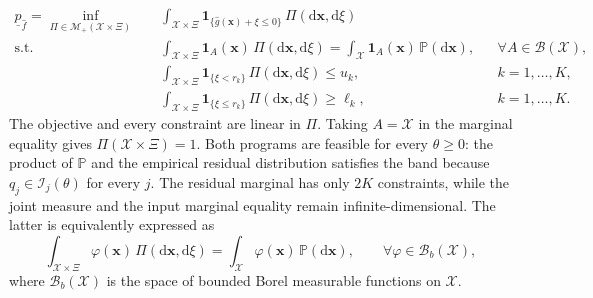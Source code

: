 \begin{equation}
  \begin{aligned}
    \underline p_{\hat f}
    =\inf_{\Pi\in\mathcal M_+(\mathcal X\times\Xi)}\quad&
    \int_{\mathcal X\times\Xi}
    \mathbf1_{\{\hat g(\bm x)+\xi\le0\}}\,\Pi\left(\mathrm d\bm x,\mathrm d\xi\right)\\
    \text{s.t.}\quad&
    \int_{\mathcal X\times\Xi}\mathbf1_A(\bm x)\,\Pi\left(\mathrm d\bm x,\mathrm d\xi\right)
    =\int_{\mathcal X}\mathbf1_A(\bm x)\,\mathbb P\left(\mathrm d\bm x\right),
    &&\forall A\in\mathcal B(\mathcal X),\\
    &\int_{\mathcal X\times\Xi}
    \mathbf1_{\{\xi<r_k\}}\,\Pi\left(\mathrm d\bm x,\mathrm d\xi\right)\le u_k,
    &&k=1,\ldots,K,\\
    &\int_{\mathcal X\times\Xi}
    \mathbf1_{\{\xi\le r_k\}}\,\Pi\left(\mathrm d\bm x,\mathrm d\xi\right)\ge\ell_k,
    &&k=1,\ldots,K.
  \end{aligned}
  \label{eq-measure-lower}
\end{equation}
The objective and every constraint are linear in $\Pi$. Taking $A=\mathcal X$ in the marginal equality gives $\Pi(\mathcal X\times\Xi)=1$. Both programs are feasible for every $\theta\ge0$: the product of $\mathbb P$ and the empirical residual distribution satisfies the band because $q_j\in\mathcal I_j(\theta)$ for every $j$. The residual marginal has only $2K$ constraints, while the joint measure and the input marginal equality remain infinite-dimensional. The latter is equivalently expressed as
\begin{equation}
  \int_{\mathcal X\times\Xi}\varphi(\bm x)\,\Pi\left(\mathrm d\bm x,\mathrm d\xi\right)
  =\int_{\mathcal X}\varphi(\bm x)\,\mathbb P\left(\mathrm d\bm x\right),
  \qquad\forall\varphi\in\mathcal B_b(\mathcal X),
  \label{eq-marginal-test-functions}
\end{equation}
where $\mathcal B_b(\mathcal X)$ is the space of bounded Borel measurable functions on $\mathcal X$.

